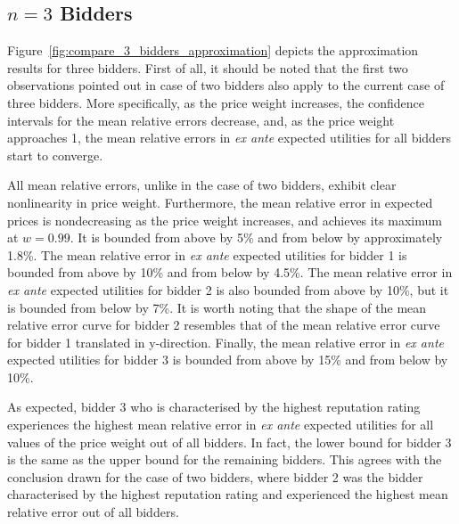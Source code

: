 \subsection{$n=3$ Bidders} %
\label{sub:n_3_bidders_approximation}
Figure~\ref{fig:compare_3_bidders_approximation} depicts the approximation results for three bidders. First of all, it should be noted that the first two observations pointed out in case of two bidders also apply to the current case of three bidders. More specifically, as the price weight increases, the confidence intervals for the mean relative errors decrease, and, as the price weight approaches 1, the mean relative errors in \emph{ex ante} expected utilities for all bidders start to converge.

All mean relative errors, unlike in the case of two bidders, exhibit clear nonlinearity in price weight. Furthermore, the mean relative error in expected prices is nondecreasing as the price weight increases, and achieves its maximum at $w = 0.99$. It is bounded from above by 5\% and from below by approximately 1.8\%. The mean relative error in \emph{ex ante} expected utilities for bidder 1 is bounded from above by 10\% and from below by 4.5\%. The mean relative error in \emph{ex ante} expected utilities for bidder 2 is also bounded from above by 10\%, but it is bounded from below by 7\%. It is worth noting that the shape of the mean relative error curve for bidder 2 resembles that of the mean relative error curve for bidder 1 translated in y-direction. Finally, the mean relative error in \emph{ex ante} expected utilities for bidder 3 is bounded from above by 15\% and from below by 10\%.

As expected, bidder 3 who is characterised by the highest reputation rating experiences the highest mean relative error in \emph{ex ante} expected utilities for all values of the price weight out of all bidders. In fact, the lower bound for bidder 3 is the same as the upper bound for the remaining bidders. This agrees with the conclusion drawn for the case of two bidders, where bidder 2 was the bidder characterised by the highest reputation rating and experienced the highest mean relative error out of all bidders.

